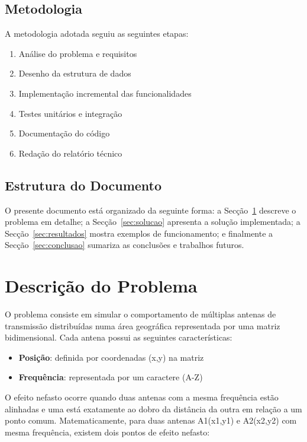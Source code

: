 \documentclass[a4paper,12pt]{article}
\begin{document}
\subsection{Metodologia}
A metodologia adotada seguiu as seguintes etapas:
\begin{enumerate}
    \item Análise do problema e requisitos
    \item Desenho da estrutura de dados
    \item Implementação incremental das funcionalidades
    \item Testes unitários e integração
    \item Documentação do código
    \item Redação do relatório técnico
\end{enumerate}

\subsection{Estrutura do Documento}
O presente documento está organizado da seguinte forma: a Secção~\ref{sec:problema} descreve o problema em detalhe; a Secção~\ref{sec:solucao} apresenta a solução implementada; a Secção~\ref{sec:resultados} mostra exemplos de funcionamento; e finalmente a Secção~\ref{sec:conclusao} sumariza as conclusões e trabalhos futuros.

\newpage 

\section{Descrição do Problema}
\label{sec:problema}

O problema consiste em simular o comportamento de múltiplas antenas de transmissão distribuídas numa área geográfica representada por uma matriz bidimensional. Cada antena possui as seguintes características:

\begin{itemize}
    \item \textbf{Posição}: definida por coordenadas (x,y) na matriz
    \item \textbf{Frequência}: representada por um caractere (A-Z)
\end{itemize}

O efeito nefasto ocorre quando duas antenas com a mesma frequência estão alinhadas e uma está exatamente ao dobro da distância da outra em relação a um ponto comum. Matematicamente, para duas antenas A1(x1,y1) e A2(x2,y2) com mesma frequência, existem dois pontos de efeito nefasto:
\end{document}
